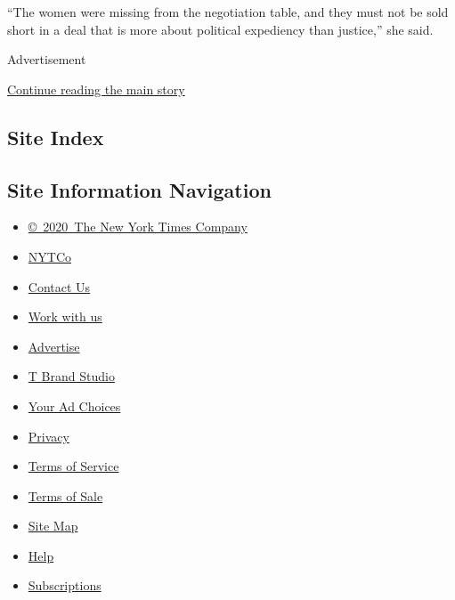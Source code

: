 ``The women were missing from the negotiation table, and they must not
be sold short in a deal that is more about political expediency than
justice,'' she said.

Advertisement

\protect\hyperlink{after-bottom}{Continue reading the main story}

\hypertarget{site-index}{%
\subsection{Site Index}\label{site-index}}

\hypertarget{site-information-navigation}{%
\subsection{Site Information
Navigation}\label{site-information-navigation}}

\begin{itemize}
\tightlist
\item
  \href{https://help.nytimes.com/hc/en-us/articles/115014792127-Copyright-notice}{©~2020~The
  New York Times Company}
\end{itemize}

\begin{itemize}
\tightlist
\item
  \href{https://www.nytco.com/}{NYTCo}
\item
  \href{https://help.nytimes.com/hc/en-us/articles/115015385887-Contact-Us}{Contact
  Us}
\item
  \href{https://www.nytco.com/careers/}{Work with us}
\item
  \href{https://nytmediakit.com/}{Advertise}
\item
  \href{http://www.tbrandstudio.com/}{T Brand Studio}
\item
  \href{https://www.nytimes.com/privacy/cookie-policy\#how-do-i-manage-trackers}{Your
  Ad Choices}
\item
  \href{https://www.nytimes.com/privacy}{Privacy}
\item
  \href{https://help.nytimes.com/hc/en-us/articles/115014893428-Terms-of-service}{Terms
  of Service}
\item
  \href{https://help.nytimes.com/hc/en-us/articles/115014893968-Terms-of-sale}{Terms
  of Sale}
\item
  \href{https://spiderbites.nytimes.com}{Site Map}
\item
  \href{https://help.nytimes.com/hc/en-us}{Help}
\item
  \href{https://www.nytimes.com/subscription?campaignId=37WXW}{Subscriptions}
\end{itemize}
